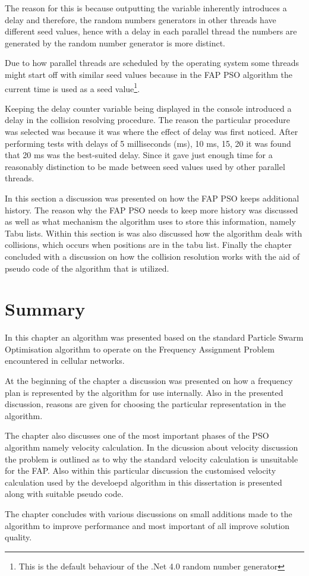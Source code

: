 The reason for this is because outputting the variable inherently introduces a delay and therefore, the random numbers generators in other threads have different seed values, hence with a delay in each parallel thread the numbers are generated by the random number generator is more distinct. 

Due to how parallel threads are scheduled by the operating system some threads might start off with similar seed values because in  the FAP PSO algorithm the current time is used as a seed value\footnote{This is the default behaviour of the .Net 4.0 random number generator}.

Keeping the delay counter variable being displayed in the console introduced a delay in the collision resolving procedure. The reason the particular procedure was selected was because it was where the effect of delay was first noticed. After performing tests with delays of 5 milliseconds (ms), 10 ms, 15, 20 it was found that 20 ms was the best-suited delay. Since it gave just enough time for a reasonably distinction to be made between seed values used by other parallel threads.

In this section a discussion was presented on how the FAP PSO keeps additional history. The reason why the FAP PSO needs to keep more history was discussed as well as what mechanism the algorithm uses to store this information, namely Tabu lists. Within this section is was also discussed how the algorithm deals with collisions, which occurs when positions are in the tabu list. Finally the chapter concluded with a discussion on how the collision resolution works with the aid of pseudo code of the algorithm that is utilized.

\section{Summary}
In this chapter an algorithm was presented based on the standard Particle Swarm Optimisation algorithm to operate on the Frequency Assignment Problem encountered in cellular networks.

At the beginning of the chapter a discussion was presented on how a frequency plan is represented by the algorithm for use internally. Also in the presented discussion, reasons are given for choosing the particular representation in the algorithm.

The chapter also discusses one of the most important phases of the PSO algorithm namely velocity calculation. In the dicussion about velocity discussion the problem is outlined as to why the standard velocity calculation is unsuitable for the FAP. Also within this particular discussion the customised velocity calculation used by the develoepd algorithm in this dissertation is presented along with suitable pseudo code.

The chapter concludes with various discussions on small additions made to the algorithm to improve performance and most important of all improve solution quality.
